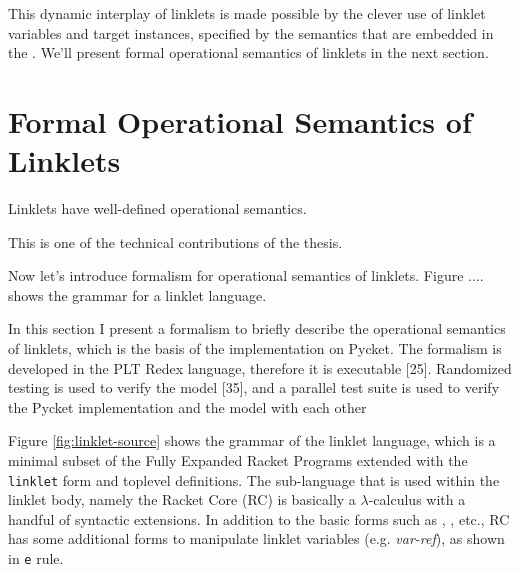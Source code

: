 		\begin{paragraph-here}
			This dynamic interplay of linklets is made possible by the clever use of linklet variables and target instances, specified by the semantics that are embedded in the . We'll present formal operational semantics of linklets in the next section.
		\end{paragraph-here}

	\section[\texorpdfstring{Formal Operational Semantics of Linklets}{Formal Semantics for Linklets}]{Formal Operational Semantics of Linklets}

		\begin{mainpoint}
			Linklets have well-defined operational semantics.

			This is one of the technical contributions of the thesis.
		\end{mainpoint}

		\begin{paragraph-here}
			Now let's introduce formalism for operational semantics of linklets. Figure .... shows the grammar for a linklet language.

			In this section I present a formalism to briefly describe the operational semantics of linklets, which is the basis of the implementation on Pycket. The formalism is developed in the PLT Redex language, therefore it is executable [25]. Randomized testing is used to verify the model [35], and a parallel test suite is used to verify the Pycket implementation and the model with each other
		\end{paragraph-here}


		\begin{paragraph-here}
			Figure \ref{fig:linklet-source} shows the grammar of the linklet
			language, which is a minimal subset of the Fully Expanded Racket
			Programs extended with the \verb|linklet| form and toplevel
			definitions. The sub-language that is used within the linklet body,
			namely the Racket Core (RC) is basically a $\lambda$-calculus with a handful
			of syntactic extensions. In addition to the basic forms such
			as , ,  etc., RC has
			some additional forms to manipulate linklet variables
			(e.g. \emph{var-ref}), as shown in \verb|e| rule. %
		\end{paragraph-here}

